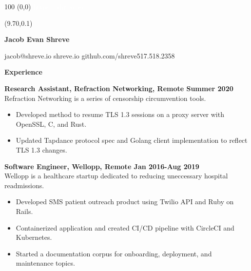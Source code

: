 \documentclass[10pt]{article}
\newcommand{\invisible}[1]{
  \begin{textblock}{100} (0,0)
    \textcolor{white}{#1}
  \end{textblock}
}
\newcommand \fullname {Jacob Evan Shreve}
\newcommand \user {shreve}
\newcommand \phone {517.518.2358}
\begin{document}
\invisible{https://shreve.io}

\begin{textblock}{0}(9.70,0.1)
\end{textblock}

\textbf{\Huge \fullname}


\vspace{0.15in}
{\Large jacob@\user.io \hfill \user.io \hfill github.com/\user \hfill \phone}\\
\vspace{0.10in}

{\LARGE\textbf{Experience}}
\vspace{0.15in}

\textbf{Research Assistant, Refraction Networking, Remote \hfill Summer 2020}\\
Refraction Networking is a series of censorship circumvention tools.
\begin{itemize}[leftmargin=1em]
  \setlength\itemsep{-0.3em}
  \item Developed method to resume TLS 1.3 sessions on a proxy server with OpenSSL, C, and Rust.
  \item Updated Tapdance protocol spec and Golang client implementation to reflect TLS 1.3 changes.
\end{itemize}
\vspace{0.15in}

\textbf{Software Engineer, Wellopp, Remote \hfill Jan 2016-Aug 2019}\\
Wellopp is a healthcare startup dedicated to reducing uneccessary hospital readmissions.
\begin{itemize}[leftmargin=1em]
  \setlength\itemsep{-0.3em}
  \item Developed SMS patient outreach product using Twilio API and Ruby on Rails.
  \item Containerized application and created CI/CD pipeline with CircleCI and Kubernetes.
  \item Started a documentation corpus for onboarding, deployment, and maintenance topics.
\end{itemize}
\vspace{0.15in}
\end{document}
